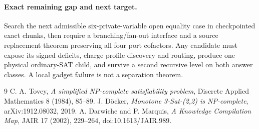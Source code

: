 \documentclass[11pt]{article}
\begin{document}
\paragraph{Exact remaining gap and next target.}
Search the next admissible six-private-variable open equality case in
checkpointed exact chunks, then require a branching/fan-out interface and a
source replacement theorem preserving all four port cofactors. Any candidate
must expose its signed deficits, charge profile discovery and routing, produce
one physical ordinary-SAT child, and survive a second recursive level on both
answer classes. A local gadget failure is not a separation theorem.

\begin{thebibliography}{9}
 C. A. Tovey, \emph{A simplified NP-complete satisfiability
problem}, Discrete Applied Mathematics 8 (1984), 85--89.
 J. D\"ocker, \emph{Monotone 3-Sat-(2,2) is NP-complete},
arXiv:1912.08032, 2019.
 A. Darwiche and P. Marquis, \emph{A Knowledge Compilation Map},
JAIR 17 (2002), 229--264, doi:10.1613/JAIR.989.
\end{thebibliography}
\end{document}
